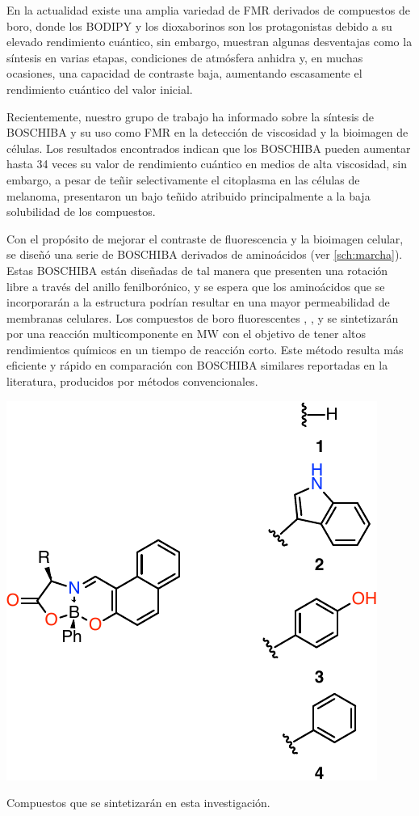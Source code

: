 En la actualidad existe una amplia variedad de \gls{FMR} derivados de compuestos de boro, donde los \gls{BODIPY} y los dioxaborinos son los protagonistas debido a su elevado rendimiento cuántico, sin embargo, muestran algunas desventajas como la síntesis en varias etapas, condiciones de atmósfera anhidra y, en muchas ocasiones, una capacidad de contraste baja, aumentando escasamente el rendimiento cuántico del valor inicial.\autocite{karpenkoPushPullDioxaborine2016,guptaBodipyBasedFluorescent2016,liBODIPYBasedTwoPhotonFluorescent2018,kimBorondifluorideComplexesHemicurcuminoids2016}

Recientemente, nuestro grupo de trabajo ha informado sobre la síntesis de \gls{BOSCHIBA} y su uso como \gls{FMR} en la detección de viscosidad y la bioimagen de células.\autocite{ibarra-rodriguezFluorescentMolecularRotors2017} Los resultados encontrados indican que los \gls{BOSCHIBA} pueden aumentar hasta 34 veces su valor de rendimiento cuántico en medios de alta viscosidad, sin embargo, a pesar de teñir selectivamente el citoplasma en las células de melanoma, presentaron un bajo teñido atribuido principalmente a la baja solubilidad de los compuestos.


Con el propósito de mejorar el contraste de fluorescencia y la bioimagen celular, se diseñó una serie de \gls{BOSCHIBA} derivados de aminoácidos (ver \cref{sch:marcha}). Estas \gls{BOSCHIBA} están diseñadas de tal manera que presenten una rotación libre a través del anillo fenilborónico, y se espera que los aminoácidos que se incorporarán a la estructura podrían resultar en una mayor permeabilidad de membranas celulares. Los compuestos de boro fluorescentes , ,  y  se sintetizarán por una reacción multicomponente en \gls{MW} con el objetivo de tener altos rendimientos químicos en un tiempo de reacción corto. Este método resulta más eficiente y rápido en comparación con \gls{BOSCHIBA} similares reportadas en la literatura, producidos por métodos convencionales.

\begin{scheme}[H]
	\centering
	\includegraphics[width=0.5\linewidth]{./Figuras/Marcha.pdf}
	\caption{Compuestos que se sintetizarán en esta investigación.}
	\label{sch:marcha}
\end{scheme}